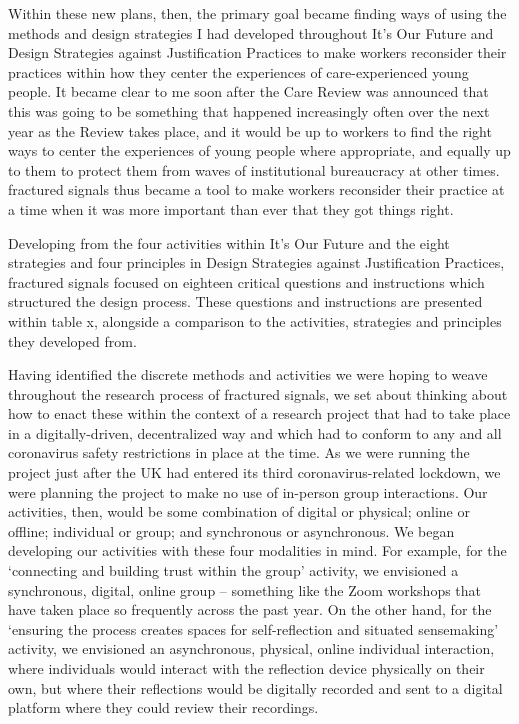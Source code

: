 Within these new plans, then, the primary goal became finding ways of using the methods and design strategies I had developed throughout It’s Our Future and Design Strategies against Justification Practices to make workers reconsider their practices within how they center the experiences of care-experienced young people. It became clear to me soon after the Care Review was announced that this was going to be something that happened increasingly often over the next year as the Review takes place, and it would be up to workers to find the right ways to center the experiences of young people where appropriate, and equally up to them to protect them from waves of institutional bureaucracy at other times. fractured signals thus became a tool to make workers reconsider their practice at a time when it was more important than ever that they got things right. 

Developing from the four activities within It’s Our Future and the eight strategies and four principles in Design Strategies against Justification Practices, fractured signals focused on eighteen critical questions and instructions which structured the design process. These questions and instructions are presented within table x, alongside a comparison to the activities, strategies and principles they developed from. 


Having identified the discrete methods and activities we were hoping to weave throughout the research process of fractured signals, we set about thinking about how to enact these within the context of a research project that had to take place in a digitally-driven, decentralized way and which had to conform to any and all coronavirus safety restrictions in place at the time. As we were running the project just after the UK had entered its third coronavirus-related lockdown, we were planning the project to make no use of in-person group interactions. Our activities, then, would be some combination of digital or physical; online or offline; individual or group; and synchronous or asynchronous. We began developing our activities with these four modalities in mind. For example, for the  ‘connecting and building trust within the group’ activity, we envisioned a synchronous, digital, online group – something like the Zoom workshops that have taken place so frequently across the past year. On the other hand,  for the ‘ensuring the process creates spaces for self-reflection and situated sensemaking’ activity, we envisioned an asynchronous, physical, online individual interaction, where individuals would interact with the reflection device physically on their own, but where their reflections would be digitally recorded and sent to a digital platform where they could review their recordings. 

